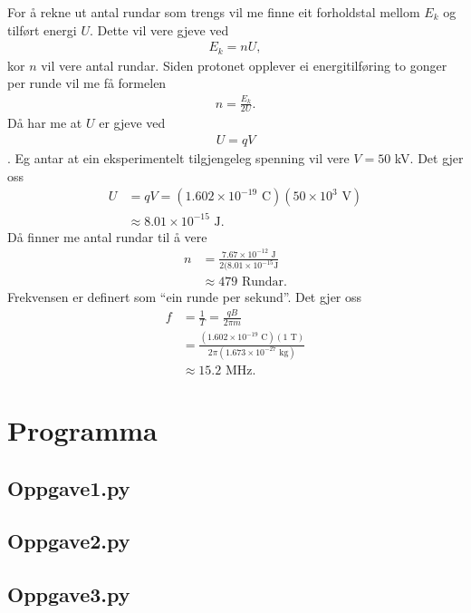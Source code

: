\documentclass[11pt, a4paper]{article}
\begin{document}
  For å rekne ut antal rundar som trengs vil me finne eit forholdstal mellom $E_k$ og tilført energi $U$. Dette vil vere gjeve ved
  \begin{align*}
    E_k = nU,
  \end{align*}
  kor $n$ vil vere antal rundar. Siden protonet opplever ei energitilføring to gonger per runde vil me få formelen
  \begin{align*}
    n = \frac{E_k}{2U}.
  \end{align*}
  Då har me at $U$ er gjeve ved
  \begin{align*}
    U = qV
  \end{align*}.
  Eg antar at ein eksperimentelt tilgjengeleg spenning vil vere $V = 50$ kV. Det gjer oss
  \begin{align*}
    U &= qV = (1.602\times10^{-19} \text{ C})(50\times10^3\text{ V}) \\
    &\approx 8.01\times10^{-15}\text{ J}.
  \end{align*}
  Då finner me antal rundar til å vere
  \begin{align*}
    n &= \frac{7.67\times10^{-12}\text{ J}}{2(8.01\times10^{-15}\text {J}} \\
    &\approx 479 \text{ Rundar}.
  \end{align*}
  Frekvensen er definert som ``ein runde per sekund''. Det gjer oss
  \begin{align*}
    f &= \frac{1}{T} = \frac{qB}{2\pi m} \\
    &= \frac{(1.602\times10^{-19}\text{ C})(1 \text{ T})}{2\pi (1.673\times10^{-27}\text{ kg})} \\
    &\approx 15.2\text{ MHz}.
  \end{align*}








\newpage

\section{Programma}
  \subsection{Oppgave1.py}
    
  \subsection{Oppgave2.py}
    
  \subsection{Oppgave3.py}
    
\end{document}
